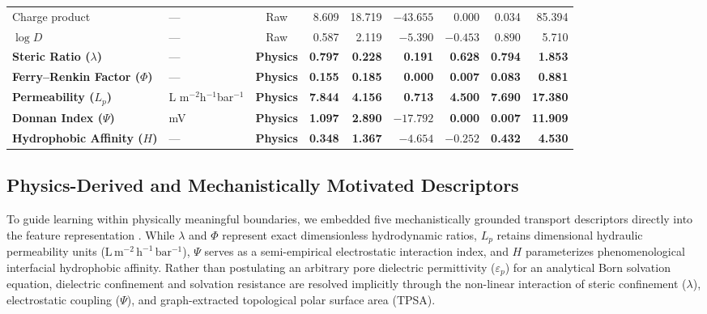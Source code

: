 \documentclass[11pt]{article}
\begin{document}
\begin{table}[htbp]
{\begin{tabular}{llcrrrrrr}
Charge product & --- & Raw & 8.609 & 18.719 & $-43.655$ & 0.000 & 0.034 & 85.394 \\
$\log D$ & --- & Raw & 0.587 & 2.119 & $-5.390$ & $-0.453$ & 0.890 & 5.710 \\
\textbf{Steric Ratio ($\lambda$)} & --- & \textbf{Physics} & \textbf{0.797} & \textbf{0.228} & \textbf{0.191} & \textbf{0.628} & \textbf{0.794} & \textbf{1.853} \\
\textbf{Ferry--Renkin Factor ($\Phi$)} & --- & \textbf{Physics} & \textbf{0.155} & \textbf{0.185} & \textbf{0.000} & \textbf{0.007} & \textbf{0.083} & \textbf{0.881} \\
\textbf{Permeability ($L_p$)} & L m$^{-2}$h$^{-1}$bar$^{-1}$ & \textbf{Physics} & \textbf{7.844} & \textbf{4.156} & \textbf{0.713} & \textbf{4.500} & \textbf{7.690} & \textbf{17.380} \\
\textbf{Donnan Index ($\Psi$)} & mV & \textbf{Physics} & \textbf{1.097} & \textbf{2.890} & \textbf{$-17.792$} & \textbf{0.000} & \textbf{0.007} & \textbf{11.909} \\
\textbf{Hydrophobic Affinity ($H$)} & --- & \textbf{Physics} & \textbf{0.348} & \textbf{1.367} & \textbf{$-4.654$} & \textbf{$-0.252$} & \textbf{0.432} & \textbf{4.530} \\
\bottomrule
\end{tabular}%
}
\end{table}

\subsection{Physics-Derived and Mechanistically Motivated Descriptors}
\label{subsec:physics}

To guide learning within physically meaningful boundaries, we embedded five mechanistically grounded transport descriptors directly into the feature representation \cite{yangaliquintanilla2009,renkin1954,bowen2002}. While $\lambda$ and $\Phi$ represent exact dimensionless hydrodynamic ratios, $L_p$ retains dimensional hydraulic permeability units ($\mathrm{L\,m^{-2}\,h^{-1}\,bar^{-1}}$), $\Psi$ serves as a semi-empirical electrostatic interaction index, and $H$ parameterizes phenomenological interfacial hydrophobic affinity. Rather than postulating an arbitrary pore dielectric permittivity ($\varepsilon_p$) for an analytical Born solvation equation, dielectric confinement and solvation resistance are resolved implicitly through the non-linear interaction of steric confinement ($\lambda$), electrostatic coupling ($\Psi$), and graph-extracted topological polar surface area (TPSA).
\end{document}
